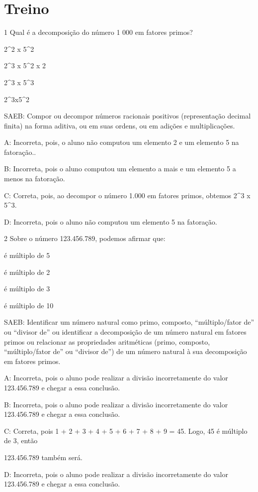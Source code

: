 \section{Treino}

\num{1} Qual é a decomposição do número 1 000 em fatores primos?
\item 2^2 x 5^2
\item 2^3 x 5^2 x 2
\item 2^3 x 5^3
\item 2^3x5^2

SAEB: Compor ou decompor números racionais positivos (representação
decimal finita) na forma aditiva, ou em suas ordens, ou em adições e
multiplicações.

A: Incorreta, pois, o aluno não computou um elemento 2 e um elemento 5
na fatoração..

B: Incorreta, pois o aluno computou um elemento a mais e um elemento 5 a
menos na fatoração.

C: Correta, pois, ao decompor o número 1.000 em fatores primos, obtemos
2^3 x 5^3.

D: Incorreta, pois o aluno não computou um elemento 5 na fatoração.

\num{2} Sobre o número 123.456.789, podemos afirmar que:
\item é múltiplo de 5
\item é múltiplo de 2
\item é múltiplo de 3
\item é múltiplo de 10

SAEB: Identificar um número natural como primo, composto,
``múltiplo/fator de'' ou ``divisor de'' ou identificar a decomposição de
um número natural em fatores primos ou relacionar as propriedades
aritméticas (primo, composto, ``múltiplo/fator de'' ou ``divisor de'')
de um número natural à sua decomposição em fatores primos.

A: Incorreta, pois o aluno pode realizar a divisão incorretamente do
valor 123.456.789 e chegar a essa conclusão.

B: Incorreta, pois o aluno pode realizar a divisão incorretamente do
valor 123.456.789 e chegar a essa conclusão.

C: Correta, pois 1 + 2 + 3 + 4 + 5 + 6 + 7 + 8 + 9 = 45. Logo, 45 é
múltiplo de 3, então

123.456.789 também será.

D: Incorreta, pois o aluno pode realizar a divisão incorretamente do
valor 123.456.789 e chegar a essa conclusão.

